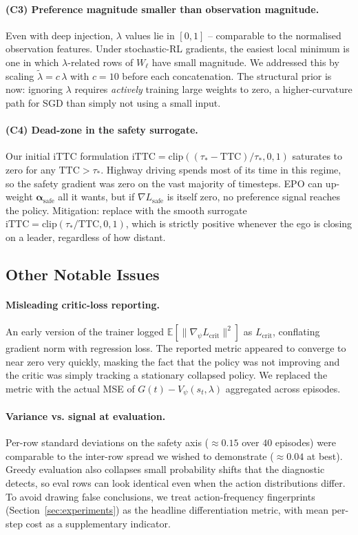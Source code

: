 \documentclass[12pt, letterpaper]{article}
\begin{document}
\paragraph{(C3) Preference magnitude smaller than observation magnitude.}
Even with deep injection, $\lambda$ values lie in $[0, 1]$ -- comparable to the normalised observation features. Under stochastic-RL gradients, the easiest local minimum is one in which $\lambda$-related rows of $W_\ell$ have small magnitude. We addressed this by scaling $\tilde{\lambda} = c\,\lambda$ with $c=10$ before each concatenation. The structural prior is now: ignoring $\lambda$ requires \emph{actively} training large weights to zero, a higher-curvature path for SGD than simply not using a small input.

\paragraph{(C4) Dead-zone in the safety surrogate.}
Our initial iTTC formulation $\mathrm{iTTC} = \mathrm{clip}((\tau_{\!*} - \mathrm{TTC})/\tau_{\!*}, 0, 1)$ saturates to zero for any $\mathrm{TTC} > \tau_{\!*}$. Highway driving spends most of its time in this regime, so the safety gradient was zero on the vast majority of timesteps. EPO can up-weight $\bm{\alpha}_{\text{safe}}$ all it wants, but if $\nabla L_{\text{safe}}$ is itself zero, no preference signal reaches the policy. Mitigation: replace with the smooth surrogate $\mathrm{iTTC} = \mathrm{clip}(\tau_{\!*} / \mathrm{TTC}, 0, 1)$, which is strictly positive whenever the ego is closing on a leader, regardless of how distant.

\subsection{Other Notable Issues}
\paragraph{Misleading critic-loss reporting.}
An early version of the trainer logged $\mathbb{E}[\|\nabla_\psi L_{\mathrm{crit}}\|^2]$ as $L_{\mathrm{crit}}$, conflating gradient norm with regression loss. The reported metric appeared to converge to near zero very quickly, masking the fact that the policy was not improving and the critic was simply tracking a stationary collapsed policy. We replaced the metric with the actual MSE of $G(t) - V_\psi(s_t,\lambda)$ aggregated across episodes.

\paragraph{Variance vs. signal at evaluation.}
Per-row standard deviations on the safety axis ($\approx 0.15$ over $40$ episodes) were comparable to the inter-row spread we wished to demonstrate ($\approx 0.04$ at best). Greedy evaluation also collapses small probability shifts that the diagnostic detects, so eval rows can look identical even when the action distributions differ. To avoid drawing false conclusions, we treat action-frequency fingerprints (Section~\ref{sec:experiments}) as the headline differentiation metric, with mean per-step cost as a supplementary indicator.
\end{document}
